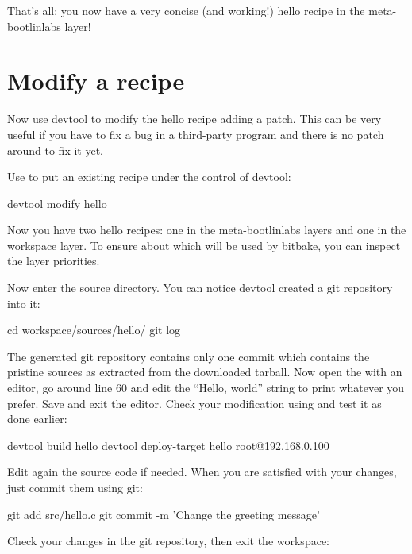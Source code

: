 That's all: you now have a very concise (and working!) hello recipe in the
meta-bootlinlabs layer!

\section{Modify a recipe}

Now use devtool to modify the hello recipe adding a patch. This can be very
useful if you have to fix a bug in a third-party program and there is no
patch around to fix it yet.

Use  to put an existing recipe under the control of devtool:
\begin{bashinput}
devtool modify hello
\end{bashinput}

Now you have two hello recipes: one in the meta-bootlinlabs layers and one
in the workspace layer. To ensure about which will be used by bitbake, you
can inspect the layer priorities.

Now enter the source directory. You can notice devtool created a git
repository into it:

\begin{bashinput}
cd workspace/sources/hello/
git log
\end{bashinput}

The generated git repository contains only one commit which contains
the pristine sources as extracted from the downloaded tarball.  Now open the
 with an editor, go around line 60 and edit the ``Hello,
world'' string to print whatever you prefer. Save and exit the
editor. Check your modification using  and
test it as done earlier:

\begin{bashinput}
devtool build hello
devtool deploy-target hello root@192.168.0.100
\end{bashinput}

Edit again the source code if needed. When you are satisfied with your
changes, just commit them using git:

\begin{bashinput}
git add src/hello.c
git commit -m 'Change the greeting message'
\end{bashinput}

Check your changes in the git repository, then exit the workspace:



